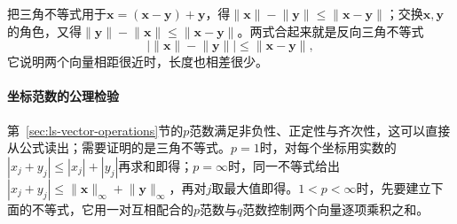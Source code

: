 把三角不等式用于$\bm x=(\bm x-\bm y)+\bm y$，得$\lVert\bm x\rVert-\lVert\bm y\rVert\leq\lVert\bm x-\bm y\rVert$；交换$\bm x,\bm y$的角色，又得$\lVert\bm y\rVert-\lVert\bm x\rVert\leq\lVert\bm x-\bm y\rVert$。两式合起来就是反向三角不等式
\begin{equation}
 \bigl|\lVert\bm x\rVert-\lVert\bm y\rVert\bigr|\leq\lVert\bm x-\bm y\rVert,
 \label{eq:ls-reverse-triangle}
\end{equation}
它说明两个向量相距很近时，长度也相差很少。

\paragraph{坐标范数的公理检验}
\label{sec:ls-norms-distances}
\label{sec:linear-algebra-distance-relations}

第~\ref{sec:ls-vector-operations}节的$p$范数满足非负性、正定性与齐次性，这可以直接从公式读出；需要证明的是三角不等式。$p=1$时，对每个坐标用实数的$|x_j+y_j|\leq|x_j|+|y_j|$再求和即得；$p=\infty$时，同一不等式给出$|x_j+y_j|\leq\lVert\bm x\rVert_\infty+\lVert\bm y\rVert_\infty$，再对$j$取最大值即得。$1<p<\infty$时，先要建立下面的不等式，它用一对互相配合的$p$范数与$q$范数控制两个向量逐项乘积之和。

